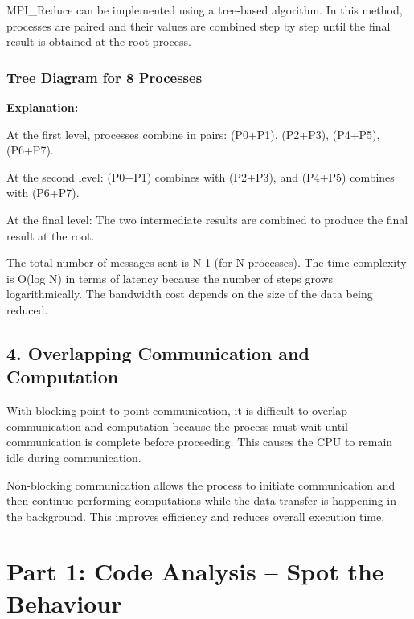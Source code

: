 \documentclass[a4paper,12pt]{article}
\begin{document}
MPI\_Reduce can be implemented using a tree-based algorithm. In this method, processes are paired and their values are combined step by step until the final result is obtained at the root process.

\subsubsection*{Tree Diagram for 8 Processes}

\begin{center}
\end{center}

\textbf{Explanation:}

At the first level, processes combine in pairs:
(P0+P1), (P2+P3), (P4+P5), (P6+P7).

At the second level:
(P0+P1) combines with (P2+P3), and (P4+P5) combines with (P6+P7).

At the final level:
The two intermediate results are combined to produce the final result at the root.

The total number of messages sent is N-1 (for N processes). The time complexity is O(log N) in terms of latency because the number of steps grows logarithmically. The bandwidth cost depends on the size of the data being reduced.

\subsection{4. Overlapping Communication and Computation}

With blocking point-to-point communication, it is difficult to overlap communication and computation because the process must wait until communication is complete before proceeding. This causes the CPU to remain idle during communication.

Non-blocking communication allows the process to initiate communication and then continue performing computations while the data transfer is happening in the background. This improves efficiency and reduces overall execution time.
\section{Part 1: Code Analysis -- Spot the Behaviour}
\end{document}
